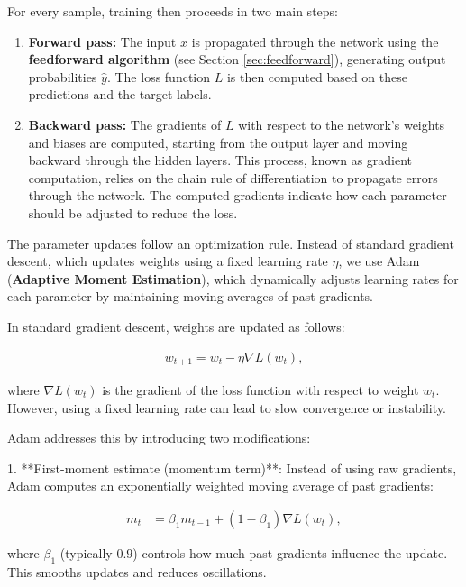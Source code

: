 For every sample, training then proceeds in two main steps:  
\begin{enumerate}  
    \item \textbf{Forward pass:} The input \( x \) is propagated through the network using the \textbf{feedforward algorithm} (see Section \ref{sec:feedforward}), generating output probabilities \( \hat{y} \).
    The loss function \( L \) is then computed based on these predictions and the target labels.  
    \item \textbf{Backward pass:} The gradients of \( L \) with respect to the network's weights and biases are computed, starting from the output layer and moving backward through the hidden layers.
    This process, known as gradient computation, relies on the chain rule of differentiation to propagate errors through the network.
    The computed gradients indicate how each parameter should be adjusted to reduce the loss.  
\end{enumerate}  

The parameter updates follow an optimization rule. Instead of standard gradient descent,  
which updates weights using a fixed learning rate \( \eta \), we use Adam (\textbf{Adaptive Moment Estimation}),  
which dynamically adjusts learning rates for each parameter by maintaining moving averages of past gradients.  

In standard gradient descent, weights are updated as follows:  

\begin{align}  
    w_{t+1} = w_t - \eta \nabla L(w_t),  
\end{align}  

where \( \nabla L(w_t) \) is the gradient of the loss function with respect to weight \( w_t \).  
However, using a fixed learning rate can lead to slow convergence or instability.  

Adam addresses this by introducing two modifications:  

1. **First-moment estimate (momentum term)**:  
   Instead of using raw gradients, Adam computes an exponentially weighted moving average of past gradients:  

   \begin{align}  
       m_t &= \beta_1 m_{t-1} + (1 - \beta_1) \nabla L(w_t),  
   \end{align}  

   where \( \beta_1 \) (typically \( 0.9 \)) controls how much past gradients influence the update.  
   This smooths updates and reduces oscillations.  

